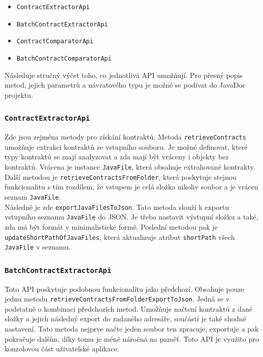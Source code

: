 				\begin{itemize}
					\item \texttt{ContractExtractorApi}
					\item \texttt{BatchContractExtractorApi}
					\item \texttt{ContractComparatorApi}
					\item \texttt{BatchContractComparatorApi}
				\end{itemize}					    	
	    	
	    	Následuje stručný výčet toho, co jednotlivá API umožňují. Pro přesný popis metod, jejich parametrů a návratového typu je možné se podívat do JavaDoc projektu.
	    
			\subsubsection{\texttt{ContractExtractorApi}}
					Zde jsou zejména metody pro získání kontraktů. Metoda \texttt{retrieveContracts} umožňuje extrakci kontraktů ze vstupního souboru. Je možné definovat, které typy kontraktů se mají analyzovat a zda mají být vráceny i objekty bez kontraktů. Vrácena je instance \texttt{JavaFile}, která obsahuje extrahované kontrakty. Další metodou je \texttt{retrieveContractsFromFolder}, která poskytuje stejnou funkcionalitu s tím rozdílem, že vstupem je celá složka nikoliv soubor a je vrácen seznam \texttt{JavaFile}.\\
					
					Následně je zde \texttt{exportJavaFilesToJson}. Tato metoda slouží k exportu vstupního seznamu \texttt{JavaFile} do JSON. Je třeba nastavit výstupní složku a také, zda má být formát v minimalistické formě. Poslední metodou pak je \texttt{updateShortPathOfJavaFiles}, která aktualizuje atribut \texttt{shortPath} všech \texttt{JavaFile} v seznamu.	    
			    
			\subsubsection{\texttt{BatchContractExtractorApi}}	
				Toto API poskytuje podobnou funkcionalitu jako předchozí. Obsahuje pouze jednu metodu \texttt{retrieveContractsFromFolderExportToJson}. Jedná se v podstatně o kombinaci předchozích metod. Umožňuje načtení kontraktů z dané složky a jejich následný export do zadaného adresáře, součástí je také shodné nastavení. Tato metoda nejprve načte jeden soubor ten zpracuje, exportuje a pak pokračuje dalším, díky tomu je méně náročná na paměť. Toto API je využito pro konzolovou část uživatelské aplikace.
				
